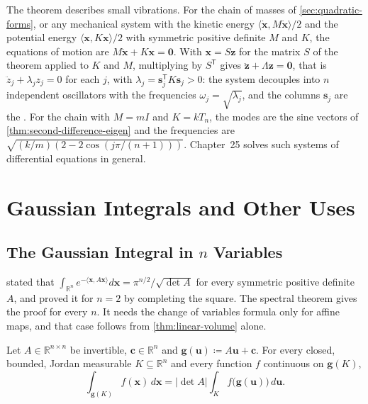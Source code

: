 The theorem describes small vibrations. For the chain of masses of \cref{sec:quadratic-forms}, or any mechanical system with the kinetic energy $\langle\dot{\mathbf x},M\dot{\mathbf x}\rangle/2$ and the potential energy $\langle\mathbf x,K\mathbf x\rangle/2$ with symmetric positive definite $M$ and $K$, the equations of motion are $M\ddot{\mathbf x}+K\mathbf x=\mathbf 0$. With $\mathbf x=S\mathbf z$ for the matrix $S$ of the theorem applied to $K$ and $M$, multiplying by $S^{\mathsf T}$ gives $\ddot{\mathbf z}+\Lambda\mathbf z=\mathbf 0$, that is $\ddot z_j+\lambda_jz_j=0$ for each $j$, with $\lambda_j=\mathbf s_j^{\mathsf T}K\mathbf s_j>0$: the system decouples into $n$ independent oscillators with the frequencies $\omega_j=\sqrt{\lambda_j}$, and the columns $\mathbf s_j$ are the . For the chain with $M=mI$ and $K=kT_n$, the modes are the sine vectors of \cref{thm:second-difference-eigen} and the frequencies are $\sqrt{(k/m)(2-2\cos(j\pi/(n+1)))}$. Chapter~25 solves such systems of differential equations in general.

\section{Gaussian Integrals and Other Uses}
\label{sec:gaussian-uses}

\subsection{The Gaussian Integral in \texorpdfstring{$n$}{n} Variables}

 stated that $\int_{\mathbb R^n}e^{-\langle\mathbf x,A\mathbf x\rangle}d\mathbf x=\pi^{n/2}/\sqrt{\det A}$ for every symmetric positive definite $A$, and proved it for $n=2$ by completing the square. The spectral theorem gives the proof for every $n$. It needs the change of variables formula only for affine maps, and that case follows from \cref{thm:linear-volume} alone.

\begin{lemma}
\label{lem:affine-substitution}
Let $A\in\mathbb R^{n\times n}$ be invertible, $\mathbf c\in\mathbb R^n$ and $\mathbf g(\mathbf u)\coloneqq A\mathbf u+\mathbf c$. For every closed, bounded, Jordan measurable $K\subseteq\mathbb R^n$ and every function $f$ continuous on $\mathbf g(K)$,
\[
\int_{\mathbf g(K)}f(\mathbf x)\,d\mathbf x=|\det A|\int_Kf\bigl(\mathbf g(\mathbf u)\bigr)\,d\mathbf u .
\]
\end{lemma}

